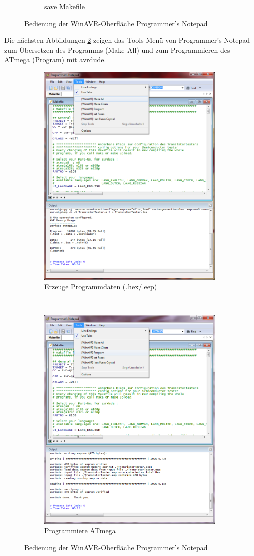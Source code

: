 \begin{figure}[H]
\begin{subfigure}[b]{9cm}
    \caption{save Makefile}
  \end{subfigure}
  \caption{Bedienung der WinAVR-Oberfläche Programmer's Notepad}
  \label{fig:WinAVR1}
\end{figure}

Die nächsten Abbildungen \ref{fig:WinAVR2} zeigen das Tools-Menü von Programmer's Notepad
zum Übersetzen des Programms (Make All) und zum Programmieren des ATmega (Program) mit avrdude.

\begin{figure}[H]
  \begin{subfigure}[b]{9cm}
    \centering
    \includegraphics[width=9cm]{../PNG/Notepad_make.png}
    \caption{Erzeuge Programmdaten (.hex/.eep)}
  \end{subfigure}
  ~
  \begin{subfigure}[b]{9cm}
    \centering
    \includegraphics[width=9cm]{../PNG/Notepad_program.png}
    \caption{Programmiere ATmega}
  \end{subfigure}
  \caption{Bedienung der WinAVR-Oberfläche Programmer's Notepad}
  \label{fig:WinAVR2}
\end{figure}


